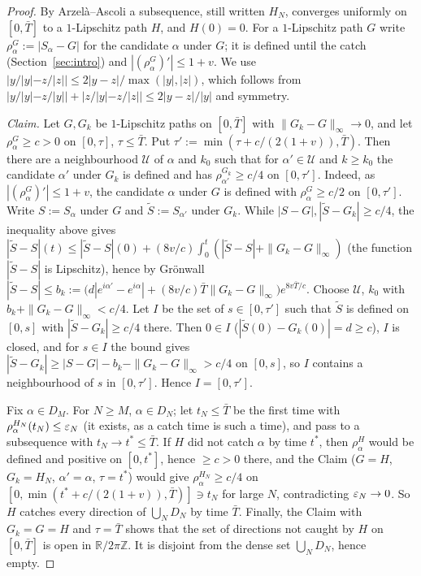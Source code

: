 \begin{proof}
By Arzel\`a--Ascoli a subsequence, still written $H_N$, converges uniformly on $[0,\bar T]$ to a $1$-Lipschitz path $H$, and
$H(0)=0$. For a $1$-Lipschitz path $G$ write $\rho^G_\alpha:=|S_\alpha-G|$ for the candidate $\alpha$ under $G$; it is defined until
the catch (Section~\ref{sec:intro}) and $|(\rho^G_\alpha)'|\le1+v$. We use $|y/|y|-z/|z||\le2|y-z|/\max(|y|,|z|)$, which follows
from $|y/|y|-z/|y||+|z/|y|-z/|z||\le2|y-z|/|y|$ and symmetry.

\emph{Claim.} Let $G,G_k$ be $1$-Lipschitz paths on $[0,\bar T]$ with $\|G_k-G\|_\infty\to0$, and let $\rho^G_\alpha\ge c>0$ on
$[0,\tau]$, $\tau\le \bar T$. Put $\tau':=\min(\tau+c/(2(1+v)),\bar T)$. Then there are a neighbourhood $\mathcal U$ of $\alpha$ and $k_0$ such
that for $\alpha'\in\mathcal U$ and $k\ge k_0$ the candidate $\alpha'$ under $G_k$ is defined and has $\rho^{G_k}_{\alpha'}\ge c/4$ on
$[0,\tau']$. Indeed, as $|(\rho^G_\alpha)'|\le1+v$, the candidate $\alpha$ under $G$ is defined with $\rho^G_\alpha\ge c/2$ on
$[0,\tau']$. Write $S:=S_\alpha$ under $G$ and $\tilde S:=S_{\alpha'}$ under $G_k$.
While $|S-G|,|\tilde S-G_k|\ge c/4$, the inequality above gives
$|\tilde S-S|(t)\le|\tilde S-S|(0)+(8v/c)\int_0^t(|\tilde S-S|+\|G_k-G\|_\infty)$ (the function $|\tilde S-S|$ is Lipschitz), hence by Gr\"onwall
$|\tilde S-S|\le b_k:=\bigl(d|e^{i\alpha'}-e^{i\alpha}|+(8v/c)\bar T\|G_k-G\|_\infty\bigr)e^{8v\bar T/c}$. Choose $\mathcal U$, $k_0$ with
$b_k+\|G_k-G\|_\infty<c/4$. Let $I$ be the set of $s\in[0,\tau']$ such that $\tilde S$ is defined on $[0,s]$ with $|\tilde S-G_k|\ge c/4$
there. Then $0\in I$ ($|\tilde S(0)-G_k(0)|=d\ge c$), $I$ is closed, and for $s\in I$ the bound gives
$|\tilde S-G_k|\ge|S-G|-b_k-\|G_k-G\|_\infty>c/4$ on $[0,s]$, so $I$ contains a neighbourhood of $s$ in $[0,\tau']$. Hence
$I=[0,\tau']$.

Fix $\alpha\in D_M$. For $N\ge M$, $\alpha\in D_N$; let $t_N\le \bar T$ be the first time with $\rho^{H_N}_\alpha(t_N)\le\varepsilon_N$ (it
exists, as a catch time is such a time), and pass to a subsequence with $t_N\to t^*\le \bar T$. If $H$ did not catch $\alpha$ by time
$t^*$, then $\rho^H_\alpha$ would be defined and positive on $[0,t^*]$, hence $\ge c>0$ there, and the Claim ($G=H$, $G_k=H_N$,
$\alpha'=\alpha$, $\tau=t^*$) would give $\rho^{H_N}_\alpha\ge c/4$ on $[0,\min(t^*+c/(2(1+v)),\bar T)]\ni t_N$ for large $N$,
contradicting $\varepsilon_N\to0$. So $H$ catches every direction of $\bigcup_ND_N$ by time $\bar T$. Finally, the Claim with $G_k=G=H$ and
$\tau=\bar T$ shows that the set of directions not caught by $H$ on $[0,\bar T]$ is open in $\mathbb R/2\pi\mathbb Z$. It is disjoint from the dense set
$\bigcup_ND_N$, hence empty.
\end{proof}
